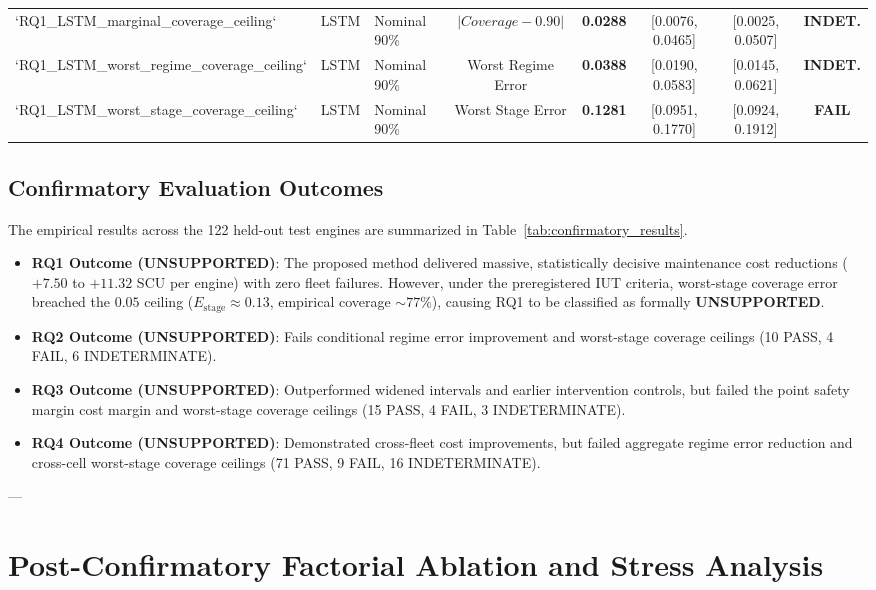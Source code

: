 \documentclass[conference]{IEEEtran}
\begin{document}
\begin{table}[t]
\begin{tabular}{lllccccc}
`RQ1_LSTM_marginal_coverage_ceiling` & LSTM & Nominal 90\% & $|Coverage - 0.90|$ & \textbf{0.0288} & [0.0076, 0.0465] & [0.0025, 0.0507] & \textbf{INDET.} \\
`RQ1_LSTM_worst_regime_coverage_ceiling`& LSTM & Nominal 90\% & Worst Regime Error & \textbf{0.0388} & [0.0190, 0.0583] & [0.0145, 0.0621] & \textbf{INDET.} \\
`RQ1_LSTM_worst_stage_coverage_ceiling` & LSTM & Nominal 90\% & Worst Stage Error & \textbf{0.1281} & [0.0951, 0.1770] & [0.0924, 0.1912] & \textbf{FAIL} \\
\bottomrule
\end{tabular}
\end{table}

\subsection{Confirmatory Evaluation Outcomes}
The empirical results across the 122 held-out test engines are summarized in Table~\ref{tab:confirmatory_results}.
\begin{itemize}
    \item \textbf{RQ1 Outcome (UNSUPPORTED)}: The proposed method delivered massive, statistically decisive maintenance cost reductions ($+7.50$ to $+11.32$ SCU per engine) with zero fleet failures. However, under the preregistered IUT criteria, worst-stage coverage error breached the $0.05$ ceiling ($E_{\text{stage}} \approx 0.13$, empirical coverage $\sim 77\%$), causing RQ1 to be classified as formally \textbf{UNSUPPORTED}.
    \item \textbf{RQ2 Outcome (UNSUPPORTED)}: Fails conditional regime error improvement and worst-stage coverage ceilings (10 PASS, 4 FAIL, 6 INDETERMINATE).
    \item \textbf{RQ3 Outcome (UNSUPPORTED)}: Outperformed widened intervals and earlier intervention controls, but failed the point safety margin cost margin and worst-stage coverage ceilings (15 PASS, 4 FAIL, 3 INDETERMINATE).
    \item \textbf{RQ4 Outcome (UNSUPPORTED)}: Demonstrated cross-fleet cost improvements, but failed aggregate regime error reduction and cross-cell worst-stage coverage ceilings (71 PASS, 9 FAIL, 16 INDETERMINATE).
\end{itemize}

---

\section{Post-Confirmatory Factorial Ablation and Stress Analysis}
\end{document}
